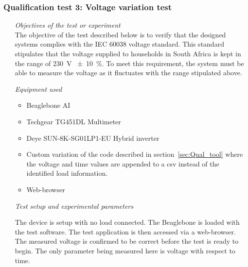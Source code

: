 \subsubsection{Qualification test 3: Voltage variation test}
\label{sec:Voltage_test}
\begin{itemize}
    \item [\emph{Objectives of the test or experiment}]\mbox{}\\
    The objective of the test described below is to verify that the designed systems complies with the IEC 60038 voltage standard. This standard stipulates that the voltage supplied to households in South Africa is kept in the range of \qty{230}{\volt} \qty{\pm 10}{\percent}. To meet this requirement, the system must be able to measure the voltage as it fluctuates with the range stipulated above.
    \item [\emph{Equipment used}]\mbox{}
    \begin{itemize} 
        \item Beaglebone AI
        \item Techgear TG451DL Multimeter
        \item Deye SUN-8K-SG01LP1-EU Hybrid inverter
        \item Custom variation of the code described in section~\ref{sec:Qual_tool} where the voltage and time values are appended to a csv instead of the identified load information.
        \item Web-browser 
    \end{itemize}
    \item [\emph{Test setup and experimental parameters}]\mbox{}
    
    The device is setup with no load connected. The Beaglebone is loaded with the test software. The test application is then accessed via a web-browser. The measured voltage is confirmed to be correct before the test is ready to begin. The only parameter being measured here is voltage with respect to time.   
    

\end{itemize}
